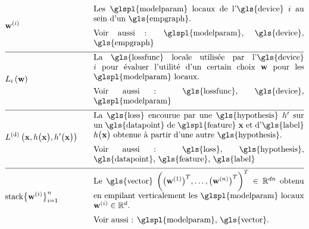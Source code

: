 \begin{align}
	&\localparams{\nodeidx} & \quad & \parbox{.75\textwidth}{
		Les \glspl{modelparam} locaux de l'\gls{device} $\nodeidx$ au sein d’un \gls{empgraph}. \\
		[2mm] Voir aussi : \glspl{modelparam}, \gls{device}, \gls{empgraph}
	} \nonumber \\[2mm] \hline \nonumber\\[-5mm]
	&\locallossfunc{\nodeidx}{\weights} & \quad & \parbox{.75\textwidth}{
		La \gls{lossfunc} locale utilisée par l'\gls{device} $\nodeidx$ pour évaluer l’utilité d’un certain choix $\weights$ pour les \glspl{modelparam} locaux. \\
		[2mm] Voir aussi : \gls{lossfunc}, \gls{device}, \glspl{modelparam}
	} \nonumber \\[2mm] \hline \nonumber\\[-5mm]
	&\gtvloss{\featurevec}{\hypothesis\big(\featurevec\big)}{\hypothesis'\big(\featurevec\big)} & \quad & \parbox{.75\textwidth}{
		La \gls{loss} encourue par une \gls{hypothesis} $\hypothesis'$ sur un \gls{datapoint} de \glspl{feature} $\featurevec$ et d'\gls{label} $\hypothesis\big( \featurevec\big)$ obtenue à partir d’une autre \gls{hypothesis}. \\
		[2mm] Voir aussi : \gls{loss}, \gls{hypothesis}, \gls{datapoint}, \gls{feature}, \gls{label}
	} \nonumber \\[2mm] \hline \nonumber\\[-5mm]
	&{\rm stack} \big\{ \weights^{(\nodeidx)} \big\}_{\nodeidx=1}^{\nrnodes} & \quad & \parbox{.75\textwidth}{
		Le \gls{vector} $\bigg( \big(\weights^{(1)}  \big)^{T}, \ldots, \big(\weights^{(\nrnodes)}  \big)^{T} \bigg)^{T} \in \mathbb{R}^{\dimlocalmodel\nrnodes}$ obtenu en empilant verticalement les \glspl{modelparam} locaux $\weights^{(\nodeidx)} \in \mathbb{R}^{\dimlocalmodel}$. \\
		[2mm] Voir aussi : \glspl{modelparam}, \gls{vector}.
	} \nonumber
\end{align}


